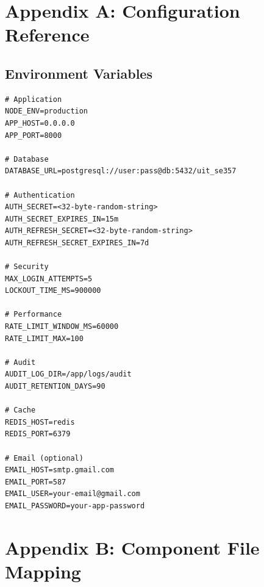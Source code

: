\documentclass[12pt,oneside,a4paper]{article}
\begin{document}
\newpage

\section*{Appendix A: Configuration Reference}

\subsection*{Environment Variables}

\begin{lstlisting}
# Application
NODE_ENV=production
APP_HOST=0.0.0.0
APP_PORT=8000

# Database
DATABASE_URL=postgresql://user:pass@db:5432/uit_se357

# Authentication
AUTH_SECRET=<32-byte-random-string>
AUTH_SECRET_EXPIRES_IN=15m
AUTH_REFRESH_SECRET=<32-byte-random-string>
AUTH_REFRESH_SECRET_EXPIRES_IN=7d

# Security
MAX_LOGIN_ATTEMPTS=5
LOCKOUT_TIME_MS=900000

# Performance
RATE_LIMIT_WINDOW_MS=60000
RATE_LIMIT_MAX=100

# Audit
AUDIT_LOG_DIR=/app/logs/audit
AUDIT_RETENTION_DAYS=90

# Cache
REDIS_HOST=redis
REDIS_PORT=6379

# Email (optional)
EMAIL_HOST=smtp.gmail.com
EMAIL_PORT=587
EMAIL_USER=your-email@gmail.com
EMAIL_PASSWORD=your-app-password
\end{lstlisting}

\newpage

\section*{Appendix B: Component File Mapping}
\end{document}
